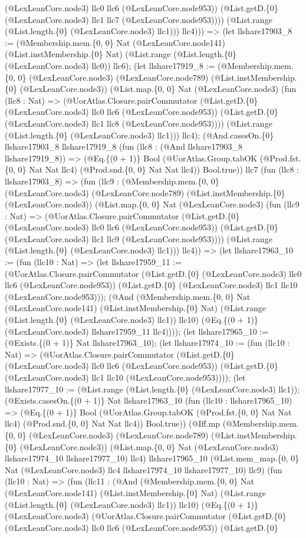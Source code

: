 \documentclass[11pt]{article}
\begin{document}
(@LexLeanCore.node3) llc0 llc6 (@LexLeanCore.node953)) (@List.getD.\{0\} (@LexLeanCore.node3) llc1 llc7 (@LexLeanCore.node953)))) (@List.range (@List.length.\{0\} (@LexLeanCore.node3) llc1))) llc4))) => (let llshare17903\_8 := (@Membership.mem.\{0, 0\} Nat (@LexLeanCore.node141) (@List.instMembership.\{0\} Nat) (@List.range (@List.length.\{0\} (@LexLeanCore.node3) llc0)) llc6); (let llshare17919\_8 := (@Membership.mem.\{0, 0\} (@LexLeanCore.node3) (@LexLeanCore.node789) (@List.instMembership.\{0\} (@LexLeanCore.node3)) (@List.map.\{0, 0\} Nat (@LexLeanCore.node3) (fun (llc8 : Nat) => (@UorAtlas.Closure.pairCommutator (@List.getD.\{0\} (@LexLeanCore.node3) llc0 llc6 (@LexLeanCore.node953)) (@List.getD.\{0\} (@LexLeanCore.node3) llc1 llc8 (@LexLeanCore.node953)))) (@List.range (@List.length.\{0\} (@LexLeanCore.node3) llc1))) llc4); (@And.casesOn.\{0\} llshare17903\_8 llshare17919\_8 (fun (llc8 : (@And llshare17903\_8 llshare17919\_8)) => (@Eq.\{(0 + 1)\} Bool (@UorAtlas.Group.tabOK (@Prod.fst.\{0, 0\} Nat Nat llc4) (@Prod.snd.\{0, 0\} Nat Nat llc4)) Bool.true)) llc7 (fun (llc8 : llshare17903\_8) => (fun (llc9 : (@Membership.mem.\{0, 0\} (@LexLeanCore.node3) (@LexLeanCore.node789) (@List.instMembership.\{0\} (@LexLeanCore.node3)) (@List.map.\{0, 0\} Nat (@LexLeanCore.node3) (fun (llc9 : Nat) => (@UorAtlas.Closure.pairCommutator (@List.getD.\{0\} (@LexLeanCore.node3) llc0 llc6 (@LexLeanCore.node953)) (@List.getD.\{0\} (@LexLeanCore.node3) llc1 llc9 (@LexLeanCore.node953)))) (@List.range (@List.length.\{0\} (@LexLeanCore.node3) llc1))) llc4)) => (let llshare17963\_10 := (fun (llc10 : Nat) => (let llshare17959\_11 := (@UorAtlas.Closure.pairCommutator (@List.getD.\{0\} (@LexLeanCore.node3) llc0 llc6 (@LexLeanCore.node953)) (@List.getD.\{0\} (@LexLeanCore.node3) llc1 llc10 (@LexLeanCore.node953))); (@And (@Membership.mem.\{0, 0\} Nat (@LexLeanCore.node141) (@List.instMembership.\{0\} Nat) (@List.range (@List.length.\{0\} (@LexLeanCore.node3) llc1)) llc10) (@Eq.\{(0 + 1)\} (@LexLeanCore.node3) llshare17959\_11 llc4)))); (let llshare17965\_10 := (@Exists.\{(0 + 1)\} Nat llshare17963\_10); (let llshare17974\_10 := (fun (llc10 : Nat) => (@UorAtlas.Closure.pairCommutator (@List.getD.\{0\} (@LexLeanCore.node3) llc0 llc6 (@LexLeanCore.node953)) (@List.getD.\{0\} (@LexLeanCore.node3) llc1 llc10 (@LexLeanCore.node953)))); (let llshare17977\_10 := (@List.range (@List.length.\{0\} (@LexLeanCore.node3) llc1)); (@Exists.casesOn.\{(0 + 1)\} Nat llshare17963\_10 (fun (llc10 : llshare17965\_10) => (@Eq.\{(0 + 1)\} Bool (@UorAtlas.Group.tabOK (@Prod.fst.\{0, 0\} Nat Nat llc4) (@Prod.snd.\{0, 0\} Nat Nat llc4)) Bool.true)) (@Iff.mp (@Membership.mem.\{0, 0\} (@LexLeanCore.node3) (@LexLeanCore.node789) (@List.instMembership.\{0\} (@LexLeanCore.node3)) (@List.map.\{0, 0\} Nat (@LexLeanCore.node3) llshare17974\_10 llshare17977\_10) llc4) llshare17965\_10 (@List.mem\_map.\{0, 0\} Nat (@LexLeanCore.node3) llc4 llshare17974\_10 llshare17977\_10) llc9) (fun (llc10 : Nat) => (fun (llc11 : (@And (@Membership.mem.\{0, 0\} Nat (@LexLeanCore.node141) (@List.instMembership.\{0\} Nat) (@List.range (@List.length.\{0\} (@LexLeanCore.node3) llc1)) llc10) (@Eq.\{(0 + 1)\} (@LexLeanCore.node3) (@UorAtlas.Closure.pairCommutator (@List.getD.\{0\} (@LexLeanCore.node3) llc0 llc6 (@LexLeanCore.node953)) (@List.getD.\{0\} 
\end{document}
